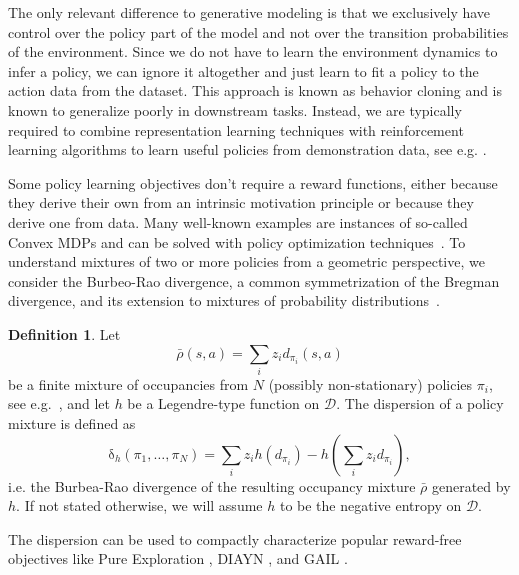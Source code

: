 \documentclass{article}
\theoremstyle{plain}
\theoremstyle{definition}
\newtheorem{definition}[theorem]{Definition}
\theoremstyle{remark}
\newcommand{\p}{\rho}  %
\newcommand{\cD}{\mathcal{D}}
\begin{document}
The only relevant difference to generative modeling is that we exclusively have control over the policy part of the model and not over the transition probabilities of the environment. Since we do not have to learn the environment dynamics to infer a policy, we can ignore it altogether and just learn to fit a policy to the action data from the dataset. This approach is known as behavior cloning and is known to generalize poorly in downstream tasks. Instead, we are typically required to combine representation learning techniques with reinforcement learning algorithms to learn useful policies from demonstration data, see e.g. \citep{GAIL}.

Some policy learning objectives don't require a reward functions, either because they derive their own from an intrinsic motivation principle or because they derive one from data. Many well-known examples are instances of so-called Convex MDPs and can be solved with policy optimization techniques~\citep{zahavy2021reward}. To understand mixtures of two or more policies from a geometric perspective, we consider the Burbeo-Rao divergence, a common symmetrization of the Bregman divergence, and its extension to mixtures of probability distributions~\citep{nielsen2011burbea, burbea2003convexity}.

\begin{definition}
    Let
\begin{equation}
    \bar\p(s,a) = \sum_{i}z_id_{\pi_i}(s,a)
\end{equation}
be a finite mixture of occupancies from $N$ (possibly non-stationary) policies $\pi_i$, see e.g.~\citep{peng2019advantageweightedregressionsimplescalable, laroche23occupancy}, and let $h$ be a Legendre-type function on $\cD$. The dispersion of a policy mixture is defined as
\begin{equation}
    \mathrm{\delta}_h(\pi_1, \dots, \pi_N) = \sum_iz_i h(d_{\pi_i}) - h\left(\sum_iz_id_{\pi_i}\right),
\end{equation}
i.e. the Burbea-Rao divergence of the resulting occupancy mixture $\bar\rho$ generated by $h$.
If not stated otherwise, we will assume $h$ to be the negative entropy on $\cD$.
\end{definition}

The dispersion can be used to compactly characterize popular reward-free objectives like Pure Exploration \citep{hazan2019provably}, DIAYN \citep{eysenbach}, and GAIL \citep{ho}. 
\end{document}
